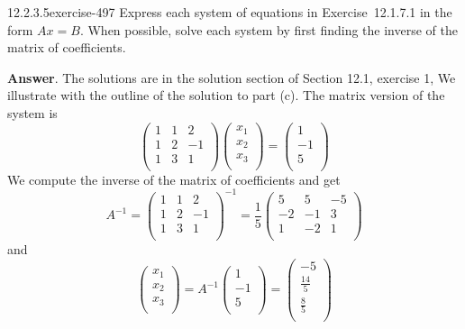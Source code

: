 \documentclass[twoside,10pt,]{book}
\numberwithin{equation}{section}
\begin{document}
\begin{divisionsolution}{12.2.3.5}{}{exercise-497}%
\hypertarget{p-4459}{}%
Express each system of equations in Exercise~12.1.7.1 in the form \(A x = B\). When possible, solve each system by first finding the inverse of the matrix of coefficients.%
\par\smallskip%
\noindent\textbf{Answer}.\quad%
\hypertarget{p-4460}{}%
The solutions are in the solution section of Section 12.1, exercise 1, We illustrate with the outline of the solution to part (c).   The matrix version of the system is%
\begin{equation*}
\left(
\begin{array}{ccc}
1 & 1 & 2 \\
1 & 2 & -1 \\
1 & 3 & 1 \\
\end{array}
\right)\left(
\begin{array}{c}
x_1 \\
x_2 \\
x_3 \\
\end{array}
\right)=\left(
\begin{array}{c}
1 \\
-1 \\
5 \\
\end{array}
\right)
\end{equation*}
We compute the inverse of the matrix of coefficients and get%
\begin{equation*}
A^{-1}=\left(
\begin{array}{ccc}
1 & 1 & 2 \\
1 & 2 & -1 \\
1 & 3 & 1 \\
\end{array}
\right)^{-1}=\frac{1}{5}\left(
\begin{array}{ccc}
5 & 5 & -5 \\
-2 & -1 & 3 \\
1 & -2 & 1 \\
\end{array}
\right)
\end{equation*}
and%
\begin{equation*}
\left(
\begin{array}{c}
x_1 \\
x_2 \\
x_3 \\
\end{array}
\right)=A^{-1}\left(
\begin{array}{c}
1 \\
-1 \\
5 \\
\end{array}
\right)=\left(
\begin{array}{c}
-5 \\
\frac{14}{5} \\
\frac{8}{5} \\
\end{array}
\right)
\end{equation*}
%
\end{divisionsolution}%
\end{document}
